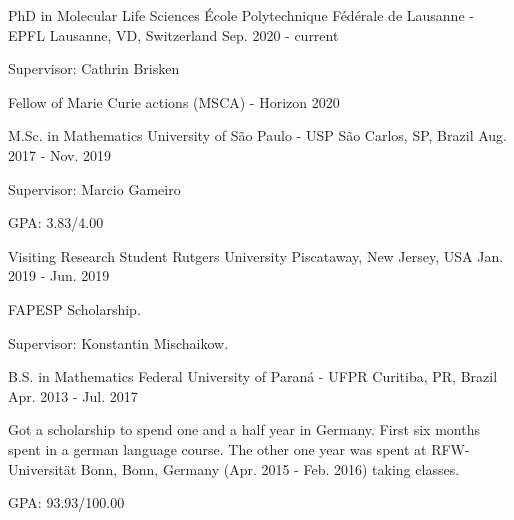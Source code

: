 

\begin{cventries}

  \cventry
    {PhD in Molecular Life Sciences} %
    {École Polytechnique Fédérale de Lausanne - EPFL} %
    {Lausanne, VD, Switzerland} %
    {Sep. 2020 - current}
    {\begin{cvitems}
        \item{Supervisor: Cathrin Brisken}
        \item{Fellow of Marie Curie actions (MSCA) - Horizon 2020}
     \end{cvitems}
    }


  \cventry
    {M.Sc. in Mathematics} %
    {University of São Paulo - USP} %
    {São Carlos, SP, Brazil} %
    {Aug. 2017 - Nov. 2019}
    {
      \begin{cvitems} %
        \item{Supervisor: Marcio Gameiro}
        \item{GPA: 3.83/4.00}
      \end{cvitems}
    }

  \cventry
    {Visiting Research Student}
    {Rutgers University}
    {Piscataway, New Jersey, USA}
    {Jan. 2019 - Jun. 2019}
    {
      \begin{cvitems}
        \item{FAPESP Scholarship.}
        \item{Supervisor: Konstantin Mischaikow.}
      \end{cvitems}
    }

  \cventry
    {B.S. in Mathematics} %
    {Federal University of Paraná - UFPR} %
    {Curitiba, PR, Brazil} %
    {Apr. 2013 - Jul. 2017} %
    {
      \begin{cvitems} %
        \item{Got a scholarship to spend one and a half year in Germany.
              First six months spent in a german language course.
              The other one year was spent at RFW-Universität Bonn, Bonn, Germany
              (Apr. 2015 - Feb. 2016) taking classes.}
        \item{GPA: 93.93/100.00}
      \end{cvitems}
    }

\end{cventries}
